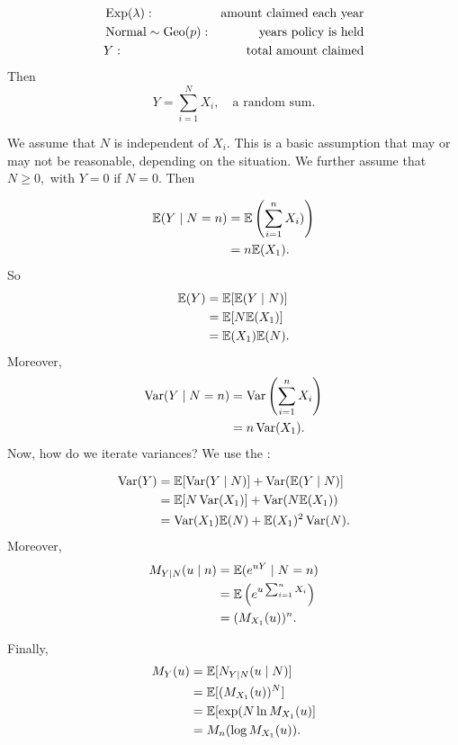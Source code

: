 \begin{eg}
\begin{align*}
    &\operatorname*{Exp}(\lambda): &\text{amount claimed each year} \\
    &\operatorname*{Normal} \sim \operatorname*{Geo}(p): &\text{years policy is held}\\
    &Y: &\text{total amount claimed}
\end{align*}
Then
$$
Y=\sum_{i=1}^N X_i, \quad \text{a random sum.}
$$

We assume that $N$ is independent of $X_i$. This is a basic assumption that may or may not be reasonable, depending on the situation. We further assume that $N\geq 0,$ with $Y=0$ if $N=0.$ Then

\begin{align*}
    \mathbb E(Y\mid N=n)&=\mathbb E\left(\sum_{i=1}^nX_i)\right)\\
    &=n\mathbb E(X_1).
\end{align*}
So
\begin{align*}
    \mathbb E(Y)&=\mathbb E[\mathbb E(Y\mid N)] \\
    &=\mathbb E[N\mathbb E(X_1)] \\
    &=\mathbb E(X_1)\mathbb E(N).
\end{align*}
Moreover,
\begin{align*}
    \operatorname*{Var}(Y\mid N=n)&=\operatorname*{Var}\left(\sum^n_{i=1} X_i\right) \\
    &=n\operatorname*{Var}(X_1).
\end{align*}
Now, how do we iterate variances? We use the :

\begin{align*}
    \operatorname*{Var}(Y)&=\mathbb E[\operatorname*{Var}(Y\mid N)] + \operatorname*{Var}(\mathbb E(Y\mid N)]\\
    &= \mathbb E[N\operatorname*{Var}(X_1)]+\operatorname*{Var}(N\mathbb E(X_1))\\
    &=\operatorname*{Var}(X_1)\mathbb E(N)+\mathbb E(X_1)^2\operatorname*{Var}(N).
\end{align*}
Moreover,
\begin{align*}
    M_{Y\mid N}(u\mid n)&=\mathbb E(e^{uY}\mid N=n) \\
    &=\mathbb E\left(e^{u\sum^n_{i=1}X_i}\right) \\
    &=(M_{X_1}(u))^n.
\end{align*}

Finally,
\begin{align*}
    M_Y(u)&= \mathbb E[N_{Y\mid N}(u\mid N)]\\
    &=\mathbb E[(M_{X_1}(u))^N]\\
    &=\mathbb E[\exp(N\ln M_{X_1}(u)] \\
    &=M_n(\log M_{X_1}(u)).
\end{align*}


\end{eg}
